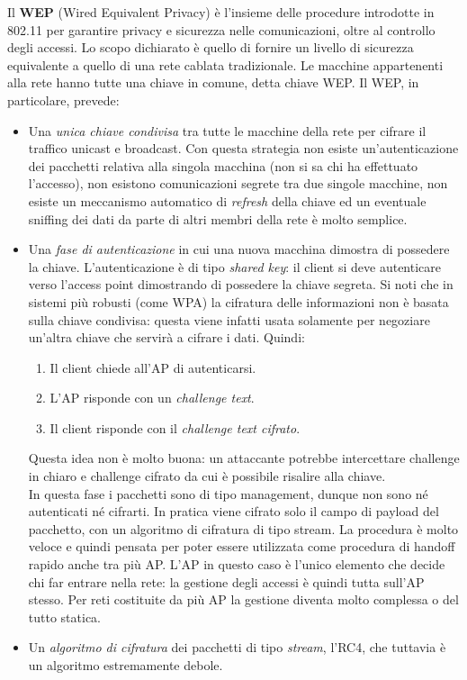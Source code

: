 Il \textbf{WEP} (Wired Equivalent Privacy) è l'insieme delle procedure introdotte in 802.11 per garantire privacy e sicurezza nelle comunicazioni, oltre al controllo degli accessi. Lo scopo dichiarato è quello di fornire un livello di sicurezza equivalente a quello di una rete cablata tradizionale. Le macchine appartenenti alla rete hanno tutte una chiave in comune, detta chiave WEP. Il WEP, in particolare, prevede:
\begin{itemize}
	\item Una \textit{unica chiave condivisa} tra tutte le macchine della rete per cifrare il traffico unicast e broadcast. Con questa strategia non esiste un'autenticazione dei pacchetti relativa alla singola macchina (non si sa chi ha effettuato l'accesso), non esistono comunicazioni segrete tra due singole macchine, non esiste un meccanismo automatico di \textit{refresh} della chiave ed un eventuale sniffing dei dati da parte di altri membri della rete è molto semplice.
	\item Una \textit{fase di autenticazione} in cui una nuova macchina dimostra di possedere la chiave. L'autenticazione è di tipo \textit{shared key}: il client si deve autenticare verso l'access point dimostrando di possedere la chiave segreta. Si noti che in sistemi più robusti (come WPA) la cifratura delle informazioni non è basata sulla chiave condivisa: questa viene infatti usata solamente per negoziare un'altra chiave che servirà a cifrare i dati. Quindi:
	\begin{enumerate}
		\item Il client chiede all'AP di autenticarsi.
		\item L'AP risponde con un \textit{challenge text}.
		\item Il client risponde con il \textit{challenge text cifrato}.
	\end{enumerate}
	Questa idea non è molto buona: un attaccante potrebbe intercettare challenge in chiaro e challenge cifrato da cui è possibile risalire alla chiave.\\
	In questa fase i pacchetti sono di tipo management, dunque non sono né autenticati né cifrarti. In pratica viene cifrato solo il campo di payload del pacchetto, con un algoritmo di cifratura di tipo stream. La procedura è molto veloce e quindi pensata per poter essere utilizzata come procedura di handoff rapido anche tra più AP. L'AP in questo caso è l'unico elemento che decide chi far entrare nella rete: la gestione degli accessi è quindi tutta sull'AP stesso. Per reti costituite da più AP la gestione diventa molto complessa o del tutto statica.
	\item Un \textit{algoritmo di cifratura} dei pacchetti di tipo \textit{stream}, l'RC4, che tuttavia è un algoritmo estremamente debole.
\end{itemize}
